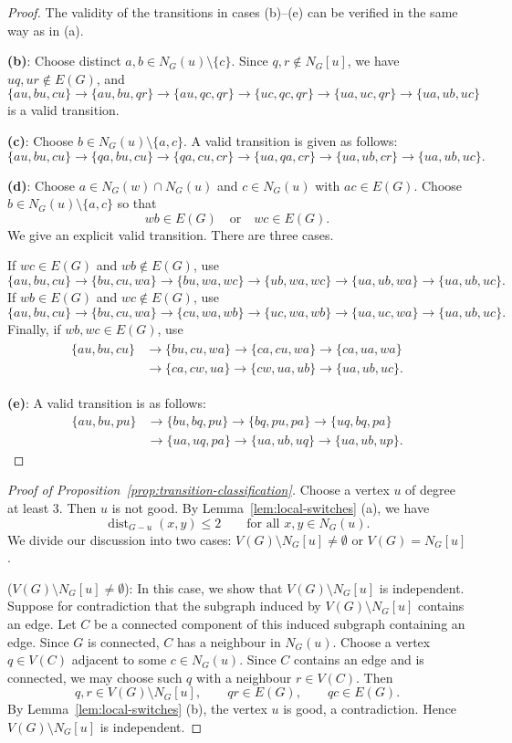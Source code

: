 \documentclass[11pt,a4paper]{amsart}
\theoremstyle{definition}
\theoremstyle{remark}
\newcommand{\dist}{\operatorname{dist}}
\begin{document}
{\begin{proof}
The validity of the transitions in cases {\rm (b)}--{\rm (e)} can be verified in the same way as in {\rm (a)}.


\noindent
{\bf (b)}: Choose distinct $a,b\in N_G(u)\setminus\{c\}$. Since $q,r\notin N_G[u]$, we have $uq,ur\notin E(G)$, and  
\[\{au,bu,cu\}\to \{au,bu,qr\}\to \{au,qc,qr\}\to \{uc,qc,qr\}\to \{ua,uc,qr\}\to \{ua,ub,uc\}\]
is a valid transition.

\noindent
{\bf (c)}: Choose $b\in N_G(u)\setminus\{a,c\}$.  A valid transition is given as follows: 
\[\{au,bu,cu\}\to \{qa,bu,cu\}\to \{qa,cu,cr\}\to \{ua,qa,cr\}\to \{ua,ub,cr\}\to \{ua,ub,uc\}.\]

\noindent
{\bf (d)}: 
Choose $a\in N_G(w)\cap N_G(u)$ and $c\in N_G(u)$ with $ac\in E(G)$. 
Choose $b\in N_G(u)\setminus\{a,c\}$ so that \[wb\in E(G)\quad\text{or}\quad wc\in E(G).\]
We give an explicit valid transition. There are three cases.

If $wc\in E(G)$ and $wb\notin E(G)$, use
\[\{au,bu,cu\}\to\{bu,cu,wa\}\to\{bu,wa,wc\}\to\{ub,wa,wc\}\to\{ua,ub,wa\}\to\{ua,ub,uc\}.\]
If $wb\in E(G)$ and $wc\notin E(G)$, use
\[\{au,bu,cu\}\to\{bu,cu,wa\}\to\{cu,wa,wb\}\to\{uc,wa,wb\}\to\{ua,uc,wa\}\to\{ua,ub,uc\}.\]
Finally, if $wb,wc\in E(G)$, use
\begin{align*}\begin{aligned}
\{au,bu,cu\}&\to\{bu,cu,wa\}\to\{ca,cu,wa\}\to\{ca,ua,wa\}\\
&\to\{ca,cw,ua\}\to\{cw,ua,ub\}\to\{ua,ub,uc\}.\end{aligned}\end{align*}

\noindent
{\bf (e)}: A valid transition is as follows: 
\[\begin{aligned}
\{au,bu,pu\}&\to \{bu,bq,pu\}\to \{bq,pu,pa\}\to \{uq,bq,pa\}\\
&\to \{ua,uq,pa\}\to \{ua,ub,uq\}\to \{ua,ub,up\}.\end{aligned}\]
\end{proof}

\begin{proof}[Proof of Proposition~\ref{prop:transition-classification}]
Choose a vertex $u$ of degree at least $3$. Then $u$ is not good. By Lemma~\ref{lem:local-switches} (a), we have 
\[\dist_{G - u}(x,y)\le 2 \qquad\text{for all }x,y\in N_G(u).\]
We divide our discussion into two cases: $V(G)\setminus N_G[u]\ne\emptyset$ or $V(G) = N_G[u]$. 

\medskip

\noindent
($V(G)\setminus N_G[u]\ne\emptyset$): In this case, we show that $V(G)\setminus N_G[u]$ is independent. 
Suppose for contradiction that the subgraph induced by $V(G)\setminus N_G[u]$ contains an edge. 
Let $C$ be a connected component of this induced subgraph containing an edge. Since $G$ is connected, $C$ has a neighbour in $N_G(u)$. 
Choose a vertex $q\in V(C)$ adjacent to some $c\in N_G(u)$. Since $C$ contains an edge and is connected, we may choose such $q$ with a neighbour $r\in V(C)$. 
Then \[q,r\in V(G)\setminus N_G[u],\qquad qr\in E(G),\qquad qc\in E(G).\]
By Lemma~\ref{lem:local-switches} (b), the vertex $u$ is good, a contradiction. Hence $V(G)\setminus N_G[u]$ is independent.


\end{proof}}
\end{document}
